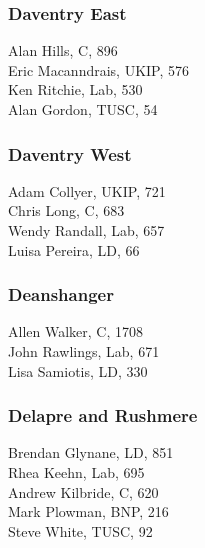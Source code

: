 \documentclass[a4paper,openany,10pt]{book}
\begin{document}
\subsubsection*{Daventry East}



Alan Hills, C, 896\\
Eric Macanndrais, UKIP, 576\\
Ken Ritchie, Lab, 530\\
Alan Gordon, TUSC, 54\\


\subsubsection*{Daventry West}



Adam Collyer, UKIP, 721\\
Chris Long, C, 683\\
Wendy Randall, Lab, 657\\
Luisa Pereira, LD, 66\\


\subsubsection*{Deanshanger}



Allen Walker, C, 1708\\
John Rawlings, Lab, 671\\
Lisa Samiotis, LD, 330\\


\subsubsection*{Delapre and Rushmere}



Brendan Glynane, LD, 851\\
Rhea Keehn, Lab, 695\\
Andrew Kilbride, C, 620\\
Mark Plowman, BNP, 216\\
Steve White, TUSC, 92\\
\end{document}
